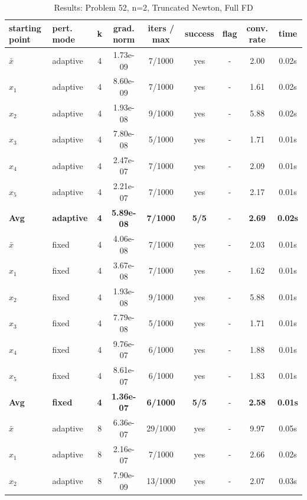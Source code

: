 \begin{longtable}{|l|l|c|c|c|c|c|c|c|}
\caption{Results: Problem 52, n=2, Truncated Newton, Full FD} \\
\hline
\textbf{starting point} & \textbf{pert. mode} & \textbf{k} & \textbf{grad. norm} & \textbf{iters / max} & \textbf{success} & \textbf{flag} & \textbf{conv. rate} & \textbf{time} \\
\hline
\endfirsthead
\endhead
\endfoot
\hline
\endlastfoot
$\bar{x}$ & adaptive & 4 & 1.73e-09 & 7/1000 & yes & - & 2.00 & 0.02s \\
\hline
$x_1$ & adaptive & 4 & 8.60e-09 & 7/1000 & yes & - & 1.61 & 0.02s \\
\hline
$x_2$ & adaptive & 4 & 1.93e-08 & 9/1000 & yes & - & 5.88 & 0.02s \\
\hline
$x_3$ & adaptive & 4 & 7.80e-08 & 5/1000 & yes & - & 1.71 & 0.01s \\
\hline
$x_4$ & adaptive & 4 & 2.47e-07 & 7/1000 & yes & - & 2.09 & 0.01s \\
\hline
$x_5$ & adaptive & 4 & 2.21e-07 & 7/1000 & yes & - & 2.17 & 0.01s \\
\hline
\hline\hline
\textbf{Avg} & \textbf{adaptive} & \textbf{4} & \textbf{5.89e-08} & \textbf{7/1000} & \textbf{5/5} & - & \textbf{2.69} & \textbf{0.02s} \\
\hline\hline
\hline
$\bar{x}$ & fixed & 4 & 4.06e-08 & 7/1000 & yes & - & 2.03 & 0.01s \\
\hline
$x_1$ & fixed & 4 & 3.67e-08 & 7/1000 & yes & - & 1.62 & 0.01s \\
\hline
$x_2$ & fixed & 4 & 1.93e-08 & 9/1000 & yes & - & 5.88 & 0.01s \\
\hline
$x_3$ & fixed & 4 & 7.79e-08 & 5/1000 & yes & - & 1.71 & 0.01s \\
\hline
$x_4$ & fixed & 4 & 9.76e-07 & 6/1000 & yes & - & 1.88 & 0.01s \\
\hline
$x_5$ & fixed & 4 & 8.61e-07 & 6/1000 & yes & - & 1.83 & 0.01s \\
\hline
\hline\hline
\textbf{Avg} & \textbf{fixed} & \textbf{4} & \textbf{1.36e-07} & \textbf{6/1000} & \textbf{5/5} & - & \textbf{2.58} & \textbf{0.01s} \\
\hline\hline
$\bar{x}$ & adaptive & 8 & 6.36e-07 & 29/1000 & yes & - & 9.97 & 0.05s \\
\hline
$x_1$ & adaptive & 8 & 2.16e-07 & 7/1000 & yes & - & 2.66 & 0.02s \\
\hline
$x_2$ & adaptive & 8 & 7.90e-09 & 13/1000 & yes & - & 2.07 & 0.03s \\

\end{longtable}
